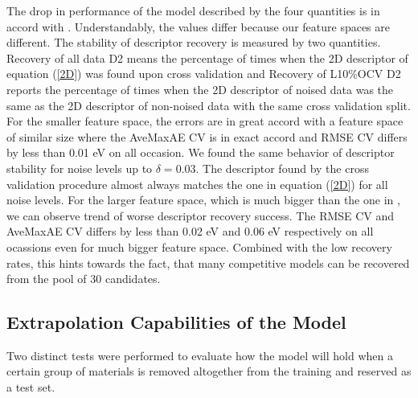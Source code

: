 \documentclass[11pt,oneside,czech,american]{book} %
\theoremstyle{plain}
\theoremstyle{definition}
\begin{document}
The drop in performance of the model described by the four quantities is in accord with \parencite{ghiringhelli17}. Understandably, the values differ because our feature spaces are different. The stability of descriptor recovery is measured by two quantities. Recovery of all data D2 means the percentage of times when the 2D descriptor of equation (\ref{2D}) was found upon cross validation and Recovery of L10\%OCV D2 reports the percentage of times when the 2D descriptor of noised data was the same as the 2D descriptor of non-noised data with the same cross validation split. For the smaller feature space, the errors are in great accord with a feature space of similar size \parencite{ghiringhelli17} where the AveMaxAE CV is in exact accord and RMSE CV differs by less than 0.01 eV on all occasion. We found the same behavior of descriptor stability for noise levels up to $\delta=0.03$. The descriptor found by the cross validation procedure almost always matches the one in equation (\ref{2D}) for all noise levels. For the larger feature space, which is much bigger than the one in \parencite{ghiringhelli17}, we can observe trend of worse descriptor recovery success. The RMSE CV and AveMaxAE CV differs by less than 0.02 eV and 0.06 eV respectively on all ocassions even for much bigger feature space. Combined with the low recovery rates, this hints towards the fact, that many competitive models can be recovered from the pool of 30 candidates.
\subsection{Extrapolation Capabilities of the Model}
Two distinct tests were performed to evaluate how the model will hold when a certain group of materials is removed altogether from the training and reserved as a test set.
\end{document}
